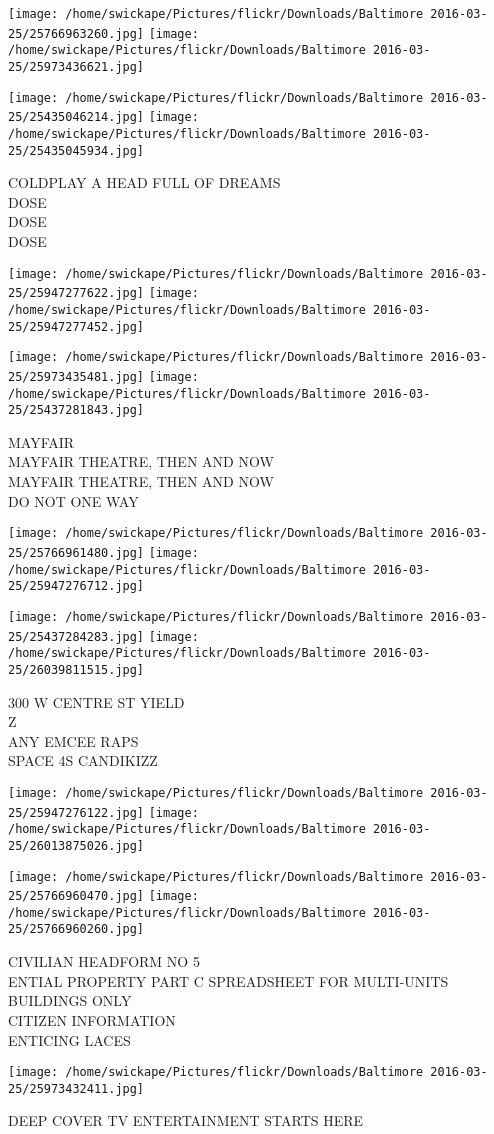 \documentclass[10pt,letterpaper]{article}
\begin{document}
\texttt{[image: /home/swickape/Pictures/flickr/Downloads/Baltimore 2016-03-25/25766963260.jpg]}
\texttt{[image: /home/swickape/Pictures/flickr/Downloads/Baltimore 2016-03-25/25973436621.jpg]}

\texttt{[image: /home/swickape/Pictures/flickr/Downloads/Baltimore 2016-03-25/25435046214.jpg]}
\texttt{[image: /home/swickape/Pictures/flickr/Downloads/Baltimore 2016-03-25/25435045934.jpg]}

COLDPLAY A HEAD FULL OF DREAMS\\
DOSE\\
DOSE\\
DOSE
\pagebreak

\texttt{[image: /home/swickape/Pictures/flickr/Downloads/Baltimore 2016-03-25/25947277622.jpg]}
\texttt{[image: /home/swickape/Pictures/flickr/Downloads/Baltimore 2016-03-25/25947277452.jpg]}

\texttt{[image: /home/swickape/Pictures/flickr/Downloads/Baltimore 2016-03-25/25973435481.jpg]}
\texttt{[image: /home/swickape/Pictures/flickr/Downloads/Baltimore 2016-03-25/25437281843.jpg]}

MAYFAIR\\
MAYFAIR THEATRE, THEN AND NOW\\
MAYFAIR THEATRE, THEN AND NOW\\
DO NOT ONE WAY
\pagebreak

\texttt{[image: /home/swickape/Pictures/flickr/Downloads/Baltimore 2016-03-25/25766961480.jpg]}
\texttt{[image: /home/swickape/Pictures/flickr/Downloads/Baltimore 2016-03-25/25947276712.jpg]}

\texttt{[image: /home/swickape/Pictures/flickr/Downloads/Baltimore 2016-03-25/25437284283.jpg]}
\texttt{[image: /home/swickape/Pictures/flickr/Downloads/Baltimore 2016-03-25/26039811515.jpg]}

300 W CENTRE ST YIELD\\
Z\\
ANY EMCEE RAPS\\
SPACE 4S CANDIKIZZ
\pagebreak

\texttt{[image: /home/swickape/Pictures/flickr/Downloads/Baltimore 2016-03-25/25947276122.jpg]}
\texttt{[image: /home/swickape/Pictures/flickr/Downloads/Baltimore 2016-03-25/26013875026.jpg]}

\texttt{[image: /home/swickape/Pictures/flickr/Downloads/Baltimore 2016-03-25/25766960470.jpg]}
\texttt{[image: /home/swickape/Pictures/flickr/Downloads/Baltimore 2016-03-25/25766960260.jpg]}

CIVILIAN HEADFORM NO 5\\
ENTIAL PROPERTY PART C SPREADSHEET FOR MULTI{-}UNITS BUILDINGS ONLY\\
CITIZEN INFORMATION\\
ENTICING LACES
\pagebreak

\texttt{[image: /home/swickape/Pictures/flickr/Downloads/Baltimore 2016-03-25/25973432411.jpg]}

DEEP COVER TV ENTERTAINMENT STARTS HERE
\pagebreak
\end{document}
